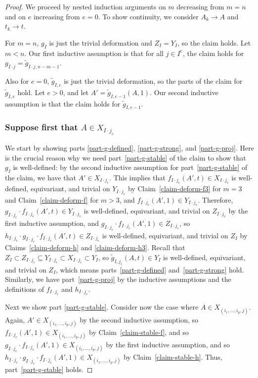 \documentclass[11pt]{article}
\numberwithin{equation}{section}
\theoremstyle{remark}
\newcommand{\compl}[1]{{{#1}^{\text{c}}}}
\begin{document}
\begin{proof}
We proceed by nested induction arguments on $m$ decreasing from $m=n$ and on $e$ increasing from $e=0$. To show continuity, we consider $A_k \to A$ and $t_k \to t$.

For $m = n$, $g_I$ is just the trivial deformation and $Z_I = Y_I$, so the claim holds. Let $m < n$. Our first inductive assumption is that for all $j\in \compl{I}$, the claim holds for $g_{I\cdot j} = \tilde g_{I\cdot j,n-m-1}$.

Also for $e=0$, $\tilde g_{I,e}$ is just the trivial deformation, so the parts of the claim for $\tilde g_{I,e}$ hold.
Let $e > 0$, and let $A' = \tilde g_{I,e-1}(A,1)$. Our second inductive assumption is that the claim holds for $\tilde g_{I,e-1}$.

\subsubsection*{Suppose first that $A \in X_{I\cdot j_e}$}

We start by showing parts \eqref{part-g-defined}, \eqref{part-g-strong}, and \eqref{part-g-proj}.
Here is the crucial reason why we need part~\eqref{part-g-stable} of the claim to show that $g_I$ is well-defined: by the second inductive assumption for part~\eqref{part-g-stable} of the claim, we have that $A' \in X_{I\cdot j_e}$. This implies that $f_{I\cdot j_e}(A',t) \in X_{I\cdot j_e}$ is well-defined, equivariant, and trivial on $Y_{I\cdot j_e}$ by Claim~\ref{claim-deform-f3} for $m=3$ and Claim~\ref{claim-deform-f} for $m>3$, and $f_{I\cdot j_e}(A',1) \in Y_{I\cdot j_e}$.
Therefore, $g_{I\cdot j_e} \cdot f_{I\cdot j_e}(A',t) \in Y_{I\cdot j_e}$ is well-defined, equivariant, and trivial on $Z_{I\cdot j_e}$ by the first inductive assumption, and $g_{I\cdot j_e} \cdot f_{I\cdot j_e}(A',1) \in Z_{I\cdot j_e}$, so $h_{I\cdot j_e}\cdot g_{I\cdot j_e}\cdot f_{I\cdot j_e}(A',t) \in Z_{I\cdot j_e}$ is well-defined, equivariant, and trivial on $Z_I$ by Claims~\ref{claim-deform-h} and \ref{claim-deform-h3}.
Recall that $Z_I \subset Z_{I\cdot j_e} \subseteq Y_{I\cdot j_e} \subset X_{I\cdot j_e} \subset Y_I$, so $\tilde g_{I, j_1}({A},t) \in Y_I$ is well-defined, equivariant, and trivial on $Z_I$, which means parts~\eqref{part-g-defined} and~\eqref{part-g-strong} hold.
Similarly, we have part~\eqref{part-g-proj} by the inductive assumptions and the definitions of $f_{I\cdot j_e}$ and $h_{I\cdot j_e}$.

Next we show part \eqref{part-g-stable}.
Consider now the case where $A \in X_{(i_1,\dots,i_{p},j)}$.
Again, $A' \in X_{(i_1,\dots,i_{p},j)}$ by the second inductive assumption, so $f_{I\cdot j_e}(A',1) \in X_{(i_1,\dots,i_{p},j)}$ by Claim~\ref{claim-stable-f}, and so $g_{I\cdot j_e}\cdot f_{I\cdot j_e}(A',1) \in X_{(i_1,\dots,i_{p},j)}$ by the first inductive assumption, and so $h_{I\cdot j_e}\cdot g_{I\cdot j_e}\cdot f_{I\cdot j_e}(A',1) \in X_{(i_1,\dots,i_{p},j)}$ by Claim~\ref{claim-stable-h}.
Thus, part~\eqref{part-g-stable} holds.


\end{proof}
\end{document}
